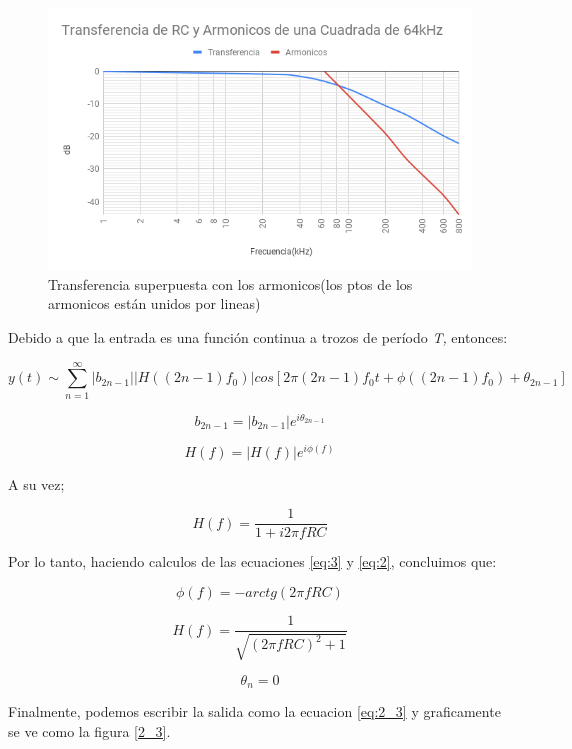 \begin{figure}[h]
\begin{centering}
\includegraphics[scale=0.4]{resources2/Med_Arm}
\par\end{centering}
\caption{Transferencia superpuesta con los armonicos(los ptos de los armonicos
están unidos por lineas)}

\end{figure}

Debido a que la entrada es una función continua a trozos de período
\emph{T, }entonces:

\[
y(t)\sim\sum_{n=1}^{\infty}\left|b_{2n-1}\right|\left|H\left((2n-1)f_{0}\right)\right|cos\left[2\pi(2n-1)f_{0}t+\phi((2n-1)f_{0})+\theta_{2n-1}\right]
\]

\begin{equation}
b_{2n-1}=\left|b_{2n-1}\right|e^{i\theta_{2n-1}}\label{eq:3}
\end{equation}

\[
H(f)=\left|H(f)\right|e^{i\phi(f)}
\]

A su vez;

\begin{equation}
H(f)=\frac{1}{1+i2\pi fRC}\label{eq:2}
\end{equation}

Por lo tanto, haciendo calculos de las ecuaciones \ref{eq:3} y \ref{eq:2},
concluimos que:

\[
\phi(f)=-arctg(2\pi fRC)
\]

\[
H(f)=\frac{1}{\sqrt{(2\pi fRC)^{2}+1}}
\]

\[
\theta_{n}=0
\]

Finalmente, podemos escribir la salida como la ecuacion \ref{eq:2_3}
y graficamente se ve como la figura \ref{2_3}.

